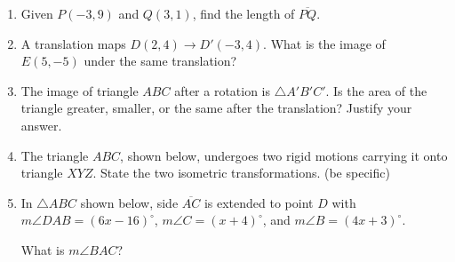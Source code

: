 \documentclass[12pt, twoside]{article}
\begin{document}
\begin{enumerate}
    \item Given $P(-3,9)$ and $Q(3,1)$, find the length of $\overline{PQ}$.
        \vspace{4cm}

\newpage

    \item A translation maps $D(2,4) \rightarrow D'(-3,4)$. What is the image of $E(5,-5)$ under the same translation?  \vspace{3.5cm}

    \item The image of triangle $ABC$ after a rotation is $\triangle A'B'C'$. Is the area of the triangle greater, smaller, or the same after the translation? Justify your answer. \vspace{3.5cm}

    \item The triangle $ABC$, shown below, undergoes two rigid motions carrying it onto triangle $XYZ$. State the two isometric transformations. (be specific)\\

\newpage
    \item In  $\triangle ABC$ shown below, side $\overline{AC}$ is extended to point $D$ with $m\angle DAB=(6x-16)^\circ$, $m\angle C=(x+4)^\circ$, and $m\angle B=(4x+3)^\circ$. \\[1cm]
    \begin{center}
      \end{center} \vspace{0.5cm}
      What is $m\angle BAC$?


\end{enumerate}
\end{document}
